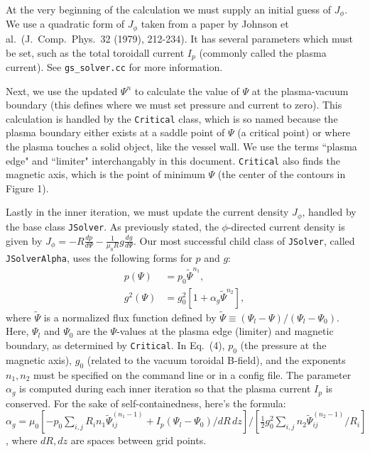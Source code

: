 \documentclass[paper=letter, fontsize=11pt]{scrartcl} %
\begin{document}
At the very beginning of the calculation we must supply an initial guess of $J_{\phi}$.  We use a quadratic form of $J_{\phi}$ taken from a paper by Johnson et al.~(J.~Comp.~Phys.~32 (1979), 212-234).  It has several parameters which must be set, such as the total toroidall current $I_p$ (commonly called the plasma current).  See \texttt{gs\_solver.cc} for more information.

Next, we use the updated $\Psi^n$ to calculate the value of $\Psi$ at the plasma-vacuum boundary (this defines where we must set pressure and current to zero).  This calculation is handled by the \texttt{Critical} class, which is so named because the plasma boundary either exists at a saddle point of $\Psi$ (a critical point) or where the plasma touches a solid object, like the vessel wall. We use the terms ``plasma edge" and ``limiter" interchangably in this document.  \texttt{Critical} also finds the magnetic axis, which is the point of minimum $\Psi$ (the center of the contours in Figure 1).  

Lastly in the inner iteration, we must update the current density $J_{\phi}$, handled by the base class \texttt{JSolver}.  As previously stated, the $\phi$-directed current density is given by $J_{\phi} = -R \frac{d p}{d \Psi} - \frac{1}{\mu_0 R} g \frac{d g}{d \Psi}$. Our most successful child class of \texttt{JSolver}, called \texttt{JSolverAlpha}, uses the following forms for $p$ and $g$:
\begin{subequations}
\begin{align}
	p(\Psi) &= p_0 \widetilde{\Psi}^{n_1},\\
          g^2(\Psi) &= g_0^2  \left[1 + \alpha_g \widetilde{\Psi}^{n_2} \right],
\end{align}
\end{subequations}
where $\widetilde{\Psi}$ is a normalized flux function defined by $\widetilde{\Psi} \equiv (\Psi_l - \Psi)/(\Psi_l - \Psi_0)$.  Here,  $\Psi_l$ and $\Psi_0$ are the $\Psi$-values at the plasma edge (limiter) and magnetic boundary, as determined by \texttt{Critical}.  In Eq.~(4), $p_0$ (the pressure at the magnetic axis), $g_0$ (related to the vacuum toroidal B-field), and the exponents $n_1,n_2$ must be specified on the command line or in a config file.  The parameter $\alpha_g$ is computed during each inner iteration so that the plasma current $I_p$ is conserved.   For the sake of self-containedness, here's the formula: $\alpha_g = \mu_0 \left[-p_0 \sum_{i,j} R_i n_1 \widetilde{\Psi}_{ij}^{(n_1-1)} + I_p (\Psi_l - \Psi_0)/dR\, dz \right] \bigg/ \left[\frac{1}{2} g_0^2 \sum_{i,j} n_2 \widetilde{\Psi}_{ij}^{(n_2-1)} / R_i\right]$, where $dR, dz$ are spaces between grid points.
\end{document}
